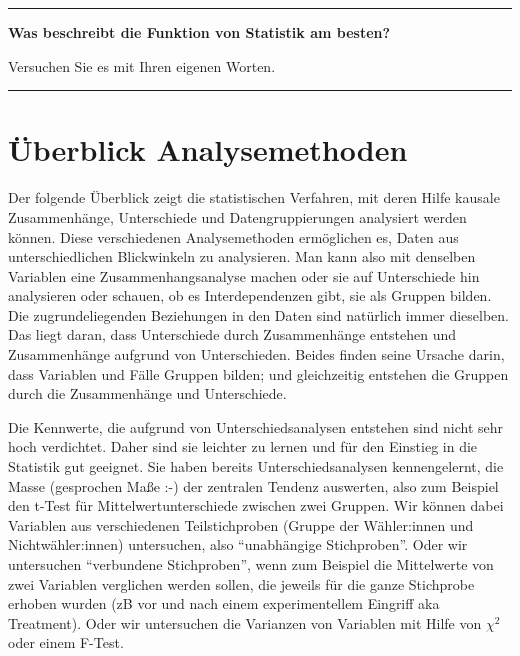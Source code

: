 \documentclass[
  10pt,
  letterpaper,
  a4paper, twoside]{scrreprt}
\begin{document}
\begin{center}\rule{0.5\linewidth}{0.5pt}\end{center}

\textbf{Was beschreibt die Funktion von Statistik am besten?}

Versuchen Sie es mit Ihren eigenen Worten.

\begin{center}\rule{0.5\linewidth}{0.5pt}\end{center}

\section*{Überblick Analysemethoden}\label{uxfcberblick-analysemethoden}


Der folgende Überblick zeigt die statistischen Verfahren, mit deren
Hilfe kausale Zusammenhänge, Unterschiede und Datengruppierungen
analysiert werden können. Diese verschiedenen Analysemethoden
ermöglichen es, Daten aus unterschiedlichen Blickwinkeln zu analysieren.
Man kann also mit denselben Variablen eine Zusammenhangsanalyse machen
oder sie auf Unterschiede hin analysieren oder schauen, ob es
Interdependenzen gibt, sie als Gruppen bilden. Die zugrundeliegenden
Beziehungen in den Daten sind natürlich immer dieselben. Das liegt
daran, dass Unterschiede durch Zusammenhänge entstehen und Zusammenhänge
aufgrund von Unterschieden. Beides finden seine Ursache darin, dass
Variablen und Fälle Gruppen bilden; und gleichzeitig entstehen die
Gruppen durch die Zusammenhänge und Unterschiede.

Die Kennwerte, die aufgrund von Unterschiedsanalysen entstehen sind
nicht sehr hoch verdichtet. Daher sind sie leichter zu lernen und für
den Einstieg in die Statistik gut geeignet. Sie haben bereits
Unterschiedsanalysen kennengelernt, die Masse (gesprochen Maße :-) der
zentralen Tendenz auswerten, also zum Beispiel den t-Test für
Mittelwertunterschiede zwischen zwei Gruppen. Wir können dabei Variablen
aus verschiedenen Teilstichproben (Gruppe der Wähler:innen und
Nichtwähler:innen) untersuchen, also \enquote{unabhängige Stichproben}.
Oder wir untersuchen \enquote{verbundene Stichproben}, wenn zum Beispiel
die Mittelwerte von zwei Variablen verglichen werden sollen, die jeweils
für die ganze Stichprobe erhoben wurden (zB vor und nach einem
experimentellem Eingriff aka Treatment). Oder wir untersuchen die
Varianzen von Variablen mit Hilfe von \(\chi^2\) oder einem F-Test.
\end{document}
